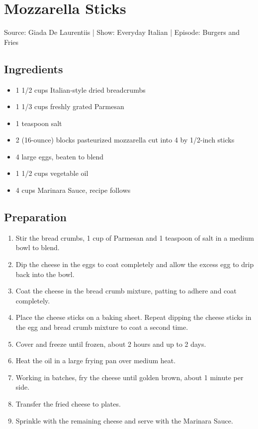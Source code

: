 \section{Mozzarella Sticks}

Source: Giada De Laurentiis |
Show: Everyday Italian |
Episode: Burgers and Fries

\subsection{Ingredients}
\begin{itemize}
    \item 1 1/2 cups Italian-style dried breadcrumbs
    \item 1 1/3 cups freshly grated Parmesan
    \item 1 teaspoon salt
    \item 2 (16-ounce) blocks pasteurized mozzarella cut into 4 by 1/2-inch sticks
    \item 4 large eggs, beaten to blend
    \item 1 1/2 cups vegetable oil
    \item 4 cups Marinara Sauce, recipe follows
\end{itemize}

\subsection{Preparation}
\begin{enumerate}
    \item Stir the bread crumbs, 1 cup of Parmesan and 1 teaspoon of salt in a medium bowl to blend. 
    \item Dip the cheese in the eggs to coat completely and allow the excess egg to drip back into the bowl. 
    \item Coat the cheese in the bread crumb mixture, patting to adhere and coat completely. 
    \item Place the cheese sticks on a baking sheet. Repeat dipping the cheese sticks in the egg and bread crumb mixture to coat a second time. 
    \item Cover and freeze until frozen, about 2 hours and up to 2 days.

    \item Heat the oil in a large frying pan over medium heat. 
    \item Working in batches, fry the cheese until golden brown, about 1 minute per side. 
    \item Transfer the fried cheese to plates. 
    \item Sprinkle with the remaining cheese and serve with the Marinara Sauce.
\end{enumerate}

